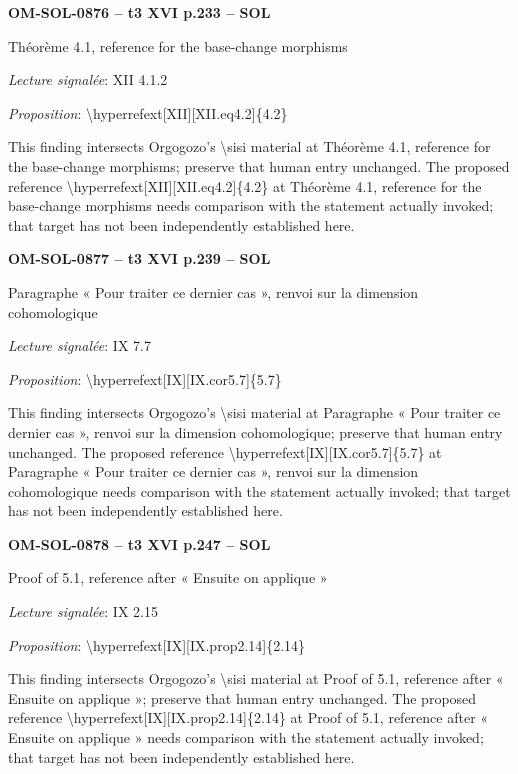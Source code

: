 \par\noindent\textbf{OM-SOL-0876 -- t3 XVI p.233 -- SOL}\par
Théorème 4.1, reference for the base-change morphisms\par
\emph{Lecture signalée}: XII 4.1.2\par
\emph{Proposition}: \textbackslash{}hyperrefext[XII][XII.eq4.2]\{4.2\}\par
This finding intersects Orgogozo's \textbackslash{}sisi material at Théorème 4.1, reference for the base-change morphisms; preserve that human entry unchanged. The proposed reference \textbackslash{}hyperrefext[XII][XII.eq4.2]\{4.2\} at Théorème 4.1, reference for the base-change morphisms needs comparison with the statement actually invoked; that target has not been independently established here.\par
\par\noindent\textbf{OM-SOL-0877 -- t3 XVI p.239 -- SOL}\par
Paragraphe « Pour traiter ce dernier cas », renvoi sur la dimension cohomologique\par
\emph{Lecture signalée}: IX 7.7\par
\emph{Proposition}: \textbackslash{}hyperrefext[IX][IX.cor5.7]\{5.7\}\par
This finding intersects Orgogozo's \textbackslash{}sisi material at Paragraphe « Pour traiter ce dernier cas », renvoi sur la dimension cohomologique; preserve that human entry unchanged. The proposed reference \textbackslash{}hyperrefext[IX][IX.cor5.7]\{5.7\} at Paragraphe « Pour traiter ce dernier cas », renvoi sur la dimension cohomologique needs comparison with the statement actually invoked; that target has not been independently established here.\par
\par\noindent\textbf{OM-SOL-0878 -- t3 XVI p.247 -- SOL}\par
Proof of 5.1, reference after « Ensuite on applique »\par
\emph{Lecture signalée}: IX 2.15\par
\emph{Proposition}: \textbackslash{}hyperrefext[IX][IX.prop2.14]\{2.14\}\par
This finding intersects Orgogozo's \textbackslash{}sisi material at Proof of 5.1, reference after « Ensuite on applique »; preserve that human entry unchanged. The proposed reference \textbackslash{}hyperrefext[IX][IX.prop2.14]\{2.14\} at Proof of 5.1, reference after « Ensuite on applique » needs comparison with the statement actually invoked; that target has not been independently established here.\par

